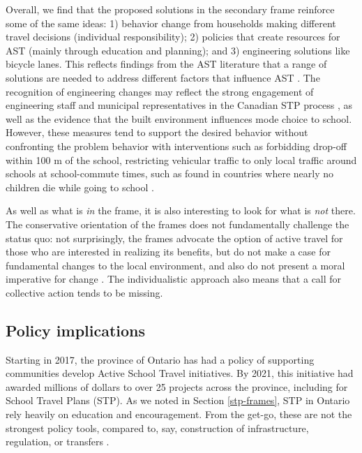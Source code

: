 \documentclass[preprint, 3p,
authoryear]{elsarticle} %
\begin{document}
Overall, we find that the proposed solutions in the secondary frame
reinforce some of the same ideas: 1) behavior change from households
making different travel decisions (individual responsibility); 2)
policies that create resources for AST (mainly through education and
planning); and 3) engineering solutions like bicycle lanes. This
reflects findings from the AST literature that a range of solutions are
needed to address different factors that influence AST
\citep[\emph{inter alia,
see}][]{mitraIndependentMobilityMode2013, panterAttitudesSocialSupport2010}.
The recognition of engineering changes may reflect the strong engagement
of engineering staff and municipal representatives in the Canadian STP
process
\citep{buttazzoniSupportingActiveSchool2018, mammenPuttingSchoolTravel2015},
as well as the evidence that the built environment influences mode
choice to school. However, these measures tend to support the desired
behavior without confronting the problem behavior with interventions
such as forbidding drop-off within 100 m of the school, restricting
vehicular traffic to only local traffic around schools at school-commute
times, such as found in countries where nearly no children die while
going to school \citep{waygood2020japan}.

As well as what is \emph{in} the frame, it is also interesting to look
for what is \emph{not} there. The conservative orientation of the frames
does not fundamentally challenge the status quo: not surprisingly, the
frames advocate the option of active travel for those who are interested
in realizing its benefits, but do not make a case for fundamental
changes to the local environment, and also do not present a moral
imperative for change \citep{severson2015moral}. The individualistic
approach also means that a call for collective action tends to be
missing.

\hypertarget{policy-implications}{%
\subsection{Policy implications}\label{policy-implications}}

Starting in 2017, the province of Ontario has had a policy of supporting
communities develop Active School Travel initiatives. By 2021, this
initiative had awarded millions of dollars to over 25 projects across
the province, including for School Travel Plans (STP). As we noted in
Section \ref{stp-frames}, STP in Ontario rely heavily on education and
encouragement. From the get-go, these are not the strongest policy
tools, compared to, say, construction of infrastructure, regulation, or
transfers \citep[see][]{ohare1989typology}.
\end{document}
